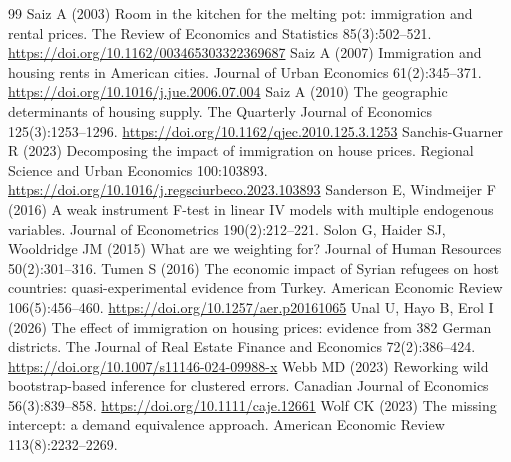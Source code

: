 \begin{thebibliography}{99}
 Saiz A (2003) Room in the kitchen for the melting pot: immigration and rental prices. The Review of Economics and Statistics 85(3):502--521. \url{https://doi.org/10.1162/003465303322369687}
 Saiz A (2007) Immigration and housing rents in American cities. Journal of Urban Economics 61(2):345--371. \url{https://doi.org/10.1016/j.jue.2006.07.004}
 Saiz A (2010) The geographic determinants of housing supply. The Quarterly Journal of Economics 125(3):1253--1296. \url{https://doi.org/10.1162/qjec.2010.125.3.1253}
 Sanchis-Guarner R (2023) Decomposing the impact of immigration on house prices. Regional Science and Urban Economics 100:103893. \url{https://doi.org/10.1016/j.regsciurbeco.2023.103893}
 Sanderson E, Windmeijer F (2016) A weak instrument F-test in linear IV models with multiple endogenous variables. Journal of Econometrics 190(2):212--221.
 Solon G, Haider SJ, Wooldridge JM (2015) What are we weighting for? Journal of Human Resources 50(2):301--316.
 Tumen S (2016) The economic impact of Syrian refugees on host countries: quasi-experimental evidence from Turkey. American Economic Review 106(5):456--460. \url{https://doi.org/10.1257/aer.p20161065}
 Unal U, Hayo B, Erol I (2026) The effect of immigration on housing prices: evidence from 382 German districts. The Journal of Real Estate Finance and Economics 72(2):386--424. \url{https://doi.org/10.1007/s11146-024-09988-x}
 Webb MD (2023) Reworking wild bootstrap-based inference for clustered errors. Canadian Journal of Economics 56(3):839--858. \url{https://doi.org/10.1111/caje.12661}
 Wolf CK (2023) The missing intercept: a demand equivalence approach. American Economic Review 113(8):2232--2269.
\end{thebibliography}
